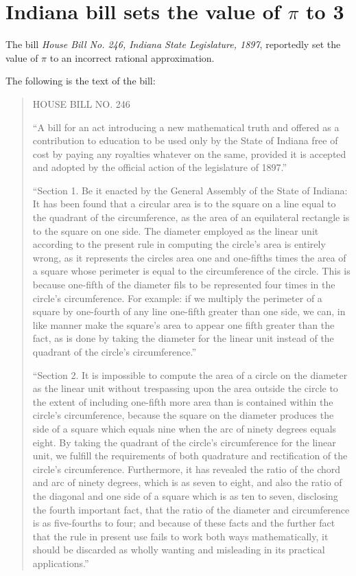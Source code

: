 \section{Indiana bill sets the value of $\pi$ to 3}


The bill {\it House Bill No. 246, Indiana State Legislature, 1897},
reportedly set the value of $\pi$ to an incorrect rational approximation.

The following is the text of the bill:

\begin{quote}
HOUSE BILL NO. 246


``A bill for an act introducing a new mathematical truth and offered as a
contribution to education to be used only by the State of Indiana free of
cost by paying any royalties whatever on the same, provided it is accepted
and adopted by the official action of the legislature of 1897.''

``Section 1. Be it enacted by the General Assembly of the State of Indiana:
It has been found that a circular area is to the square on a line equal to the
quadrant of the circumference, as the area of an equilateral rectangle is to
the square on one side. The diameter employed as the linear unit according to
the present rule in computing the circle's area is entirely wrong, as it
represents the circles area one and one-fifths times the area of a square
whose perimeter is equal to the circumference of the circle. This is because
one-fifth of the diameter fils to be represented four times in the circle's
circumference. For example: if we multiply the perimeter of a square by
one-fourth of any line one-fifth greater than one side, we can, in like
manner make the square's area to appear one fifth greater than the fact, as
is done by taking the diameter for the linear unit instead of the quadrant
of the circle's circumference.''

``Section 2. It is impossible to compute the area of a circle on the
diameter as the linear unit without trespassing upon the area outside the
circle to the extent of including one-fifth more area than is contained within
the circle's circumference, because the square on the diameter produces the
side of a square which equals nine when the arc of ninety degrees equals
eight. By taking the quadrant of the circle's circumference for the linear
unit, we fulfill the requirements of both quadrature and rectification of
the circle's circumference. Furthermore, it has revealed the ratio of the
chord and arc of ninety degrees, which is as seven to eight, and also the
ratio of the diagonal and one side of a square which is as ten to seven,
disclosing the fourth important fact, that the ratio of the diameter and
circumference is as five-fourths to four; and because of these facts and the
further fact that the rule in present use fails to work both ways
mathematically, it should be discarded as wholly wanting and misleading in
its practical applications.''



\end{quote}
